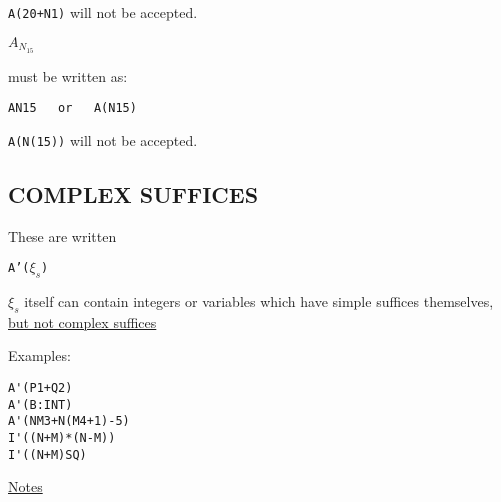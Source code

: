 \documentclass[10pt, a4paper, oneside]{article}
\newcommand{\myuline}[1]{\uline{#1}}
\newcommand{\mytt}[1]{\texttt{\scriptsize #1}}
\newcommand{\mytt}[1]{\texttt{\small #1}}
\begin{document}
\begin{multicols}{2}
\begin{flushleft}
\mytt{A(20+N1)} will not be accepted.
\end{flushleft}

\begin{addmargin}[1cm]{1em}%
\begin{math}
A_{N_{15}}
\end{math}
\end{addmargin}

\begin{flushleft}
must be written as:
\end{flushleft}

\begin{addmargin}[1cm]{1em}%
\begin{lstlisting}
AN15   or   A(N15)
\end{lstlisting}
\end{addmargin}

\begin{flushleft}
\mytt{A(N(15))} will not be accepted.
\end{flushleft}

\subsection{COMPLEX SUFFICES}

These are written

\begin{addmargin}[1cm]{1em}%
\begin{flushleft}
\mytt{A'(}$\xi_{s}$\mytt{)}
\end{flushleft}
\end{addmargin}

$\xi_{s}$ itself can contain integers or variables which
have simple suffices themselves, \myuline{but not complex suffices}

\begin{flushleft}
Examples:
\end{flushleft}

\begin{addmargin}[1cm]{1em}%
\begin{lstlisting}
A'(P1+Q2)
A'(B:INT)
A'(NM3+N(M4+1)-5)
I'((N+M)*(N-M))
I'((N+M)SQ)
\end{lstlisting}
\end{addmargin}

\begin{flushleft}
\myuline{Notes}
\end{flushleft}

\renewcommand{\labelenumi}{(\roman{enumi})}
\begin{enumerate}


\end{enumerate}
\end{multicols}
\end{document}
